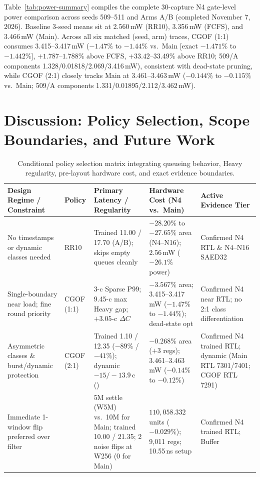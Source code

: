 Table~\ref{tab:power-summary} compiles the complete 30-capture N4 gate-level power comparison across seeds 509--511 and Arms A/B (completed November 7, 2026). Baseline 3-seed means sit at 2.560\,mW (RR10), 3.356\,mW (FCFS), and 3.466\,mW (Main). Across all six matched (seed, arm) traces, CGOF (1:1) consumes 3.415--3.417\,mW ($-1.47\%$ to $-1.44\%$ vs.\ Main [exact $-1.471\%$ to $-1.442\%$], $+1.787\text{--}1.788\%$ above FCFS, $+33.42\text{--}33.49\%$ above RR10; 509/A components 1.328/0.01818/2.069/3.416\,mW), consistent with dead-state pruning, while CGOF (2:1) closely tracks Main at 3.461--3.463\,mW ($-0.144\%$ to $-0.115\%$ vs.\ Main; 509/A components 1.331/0.01895/2.112/3.462\,mW).

\section{Discussion: Policy Selection, Scope Boundaries, and Future Work}
\label{sec:applicability}

\begin{table}[t]
\centering\footnotesize
\setlength{\tabcolsep}{3.5pt}
\begin{tabular}{@{}P{.19\textwidth}P{.11\textwidth}P{.23\textwidth}P{.21\textwidth}P{.18\textwidth}@{}}
\toprule
Design Regime / Constraint & Policy & Primary Latency / Regularity & Hardware Cost (N4 vs.\ Main) & Active Evidence Tier \\
\midrule
No timestamps or dynamic classes needed & RR10 & Trained 11.00 / 17.70 (A/B); skips empty queues cleanly & $-28.20\%$ to $-27.65\%$ area (N4--N16); 2.56\,mW ($-26.1\%$ power) & Confirmed N4 RTL \& N4--N16 SAED32 \\
Single-boundary near load; fine round priority & CGOF (1:1) & 3-c Sparse P99; 9.45-c max Heavy gap; $+3.05$-c $\Delta C$ & $-3.567\%$ area; 3.415--3.417\,mW ($-1.47\%$ to $-1.44\%$); dead-state opt & Confirmed N4 near RTL; no 2:1 class differentiation \\
Asymmetric classes \& burst/dynamic protection & CGOF (2:1) & Trained 1.10 / 12.35 ($-89\%$ / $-41\%$); dynamic $-15 / -13.9$\,c () & $-0.268\%$ area ($+3$ regs); 3.461--3.463\,mW ($-0.14\%$ to $-0.12\%$) & Confirmed N4 trained RTL; dynamic  (Main RTL 7301/7401; CGOF RTL 7291) \\
Immediate 1-window flip preferred over filter & \Alg{} & 5M settle (W5M) vs.\ 10M for Main; trained 10.00 / 21.35; 2 noise flips at W256 (0 for Main) & $110{,}058.332$ units ($-0.029\%$); 9,011 regs; 10.55\,ns setup & Confirmed N4 trained RTL; Buffer  \\
\bottomrule
\end{tabular}
\caption{Conditional policy selection matrix integrating queueing behavior, Heavy regularity, pre-layout hardware cost, and exact evidence boundaries.}
\label{tab:selection-matrix}
\end{table}

